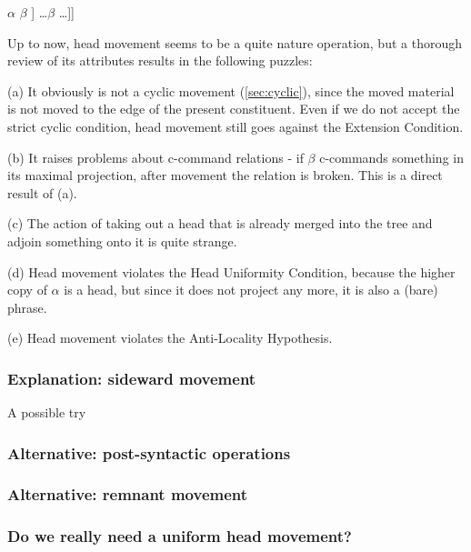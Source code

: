 \documentclass[a4paper]{article}
\begin{document}
\begin{exe}
    \ex\label{exe:head-movement} \lb{\alpha}\lb{\alpha} $\alpha$ $\beta$ ]\lb{\beta} \ldots \sout{$\beta$} \ldots]]
\end{exe}

Up to now, head movement seems to be a quite nature operation, but a thorough review of its attributes results in the following puzzles:
\begin{inparaitem}
    \item[(a)] It obviously is not a cyclic movement (\autoref{sec:cyclic}), since the moved material is not moved to the edge of the present constituent.
    Even if we do not accept the strict cyclic condition, head movement still goes against the Extension Condition.
    \item[(b)] It raises problems about c-command relations - if $\beta$ c-commands something in its maximal projection, after movement the relation is broken.
    This is a direct result of (a). 
    \item[(c)] The action of taking out a head that is already merged into the tree and adjoin something onto it is quite strange.
    \item[(d)] Head movement violates the Head Uniformity Condition, because the higher copy of $\alpha$ is a head, but since it does not project any more, it is also a (bare) phrase.
    \item[(e)] Head movement violates the Anti-Locality Hypothesis. 
\end{inparaitem}

\subsubsection{Explanation: sideward movement}

A possible try 

\subsubsection{Alternative: post-syntactic operations}

\subsubsection{Alternative: remnant movement}

\subsubsection{Do we really need a uniform head movement?}
\end{document}
